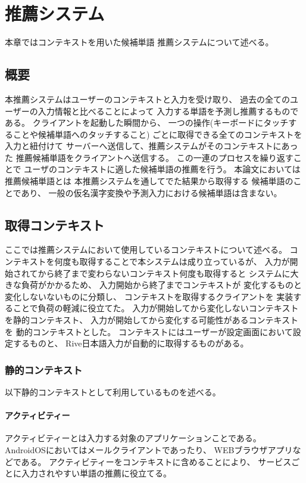 \chapter{推薦システム}
\label{chap:recommend}
本章ではコンテキストを用いた候補単語
推薦システムについて述べる。

\newpage
\section{概要}
本推薦システムはユーザーのコンテキストと入力を受け取り、
過去の全てのユーザーの入力情報と比べることによって
入力する単語を予測し推薦するものである。
クライアントを起動した瞬間から、
一つの操作(キーボードにタッチすることや候補単語へのタッチすること)
ごとに取得できる全てのコンテキストを入力と紐付けて
サーバーへ送信して、推薦システムがそのコンテキストにあった
推薦候補単語をクライアントへ送信する。
この一連のプロセスを繰り返すことで
ユーザのコンテキストに適した候補単語の推薦を行う。
本論文においては推薦候補単語とは
本推薦システムを通してでた結果から取得する
候補単語のことであり、
一般の仮名漢字変換や予測入力における候補単語は含まない。

\section{取得コンテキスト}
\label{sec:getcontext}
ここでは推薦システムにおいて使用しているコンテキストについて述べる。
コンテキストを何度も取得することで本システムは成り立っているが、
入力が開始されてから終了まで変わらないコンテキスト何度も取得すると
システムに大きな負荷がかかるため、
入力開始から終了までコンテキストが
変化するものと変化しないないものに分類し、
コンテキストを取得するクライアントを
実装することで負荷の軽減に役立てた。
入力が開始してから変化しないコンテキストを静的コンテキスト、
入力が開始してから変化する可能性があるコンテキストを
動的コンテキストとした。
コンテキストにはユーザーが設定画面において設定するものと、
Rive日本語入力が自動的に取得するものがある。

\subsection{静的コンテキスト}
\label{staticcontext}
以下静的コンテキストとして利用しているものを述べる。

\subsubsection{アクティビティー}
\label{activity}
アクティビティーとは入力する対象のアプリケーションことである。
AndroidOSにおいてはメールクライアントであったり、
WEBブラウザアプリなどである。
アクティビティーをコンテキストに含めることにより、
サービスごとに入力されやすい単語の推薦に役立てる。


